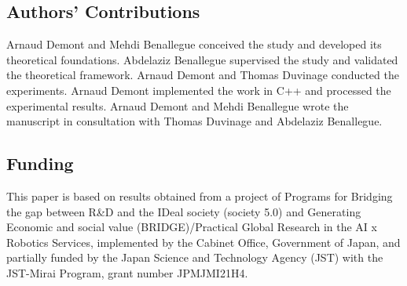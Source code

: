 \documentclass{IJCAS}
\begin{document}
\subsection*{Authors' Contributions}
Arnaud Demont and Mehdi Benallegue conceived the study and developed its theoretical foundations. Abdelaziz Benallegue supervised the study and validated the theoretical framework. Arnaud Demont and Thomas Duvinage conducted the experiments. Arnaud Demont implemented the work in C++ and processed the experimental results. Arnaud Demont and Mehdi Benallegue wrote the manuscript in consultation with Thomas Duvinage and Abdelaziz Benallegue.

\subsection*{Funding }
This paper is based on results obtained from a project of Programs for Bridging the gap between R\&D and the IDeal society (society 5.0) and Generating Economic and social value (BRIDGE)/Practical Global Research in the AI x Robotics Services, implemented by the Cabinet Office, Government of Japan, and partially funded by the Japan Science and Technology Agency (JST) with the JST-Mirai Program, grant number JPMJMI21H4.


% 
% 





\end{document}
